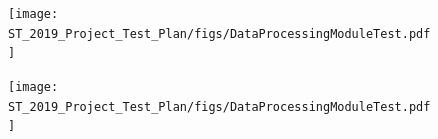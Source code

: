 \documentclass[a4paper]{article}
\newcommand{\arraystrechlength}{1.5}
\begin{document}
\begin{figure}[H]
\centering
    \texttt{[image: ST\_2019\_Project\_Test\_Plan/figs/DataProcessingModuleTest.pdf]}
\end{figure}
\begin{figure}[H]
\centering
    \texttt{[image: ST\_2019\_Project\_Test\_Plan/figs/DataProcessingModuleTest.pdf]}
\end{figure}

\end{document}

